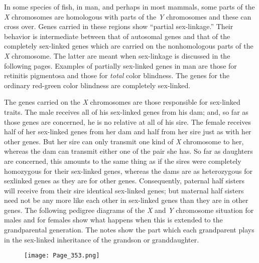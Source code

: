 In some species of fish, in man, and perhaps in most mammals, some
parts of the \textit{X} chromosomes are homologous with parts of the
\textit{Y} chromosomes and these can cross over. Genes carried in these
regions show ``partial sex-linkage.'' Their behavior is intermediate
between that of autosomal genes and that of the completely sex-linked
genes which are carried on the nonhomologous parts of the \textit{X}
chromosome. The latter are meant when sex-linkage is discussed in the
following pages. Examples of partially sex-linked genes in man are
those for retinitis pigmentosa and those for \textit{total} color
blindness. The genes for the ordinary red-green color blindness are
completely sex-linked.

The genes carried on the \textit{X} chromosomes are those responsible for
sex-linked traits. The male receives all of his sex-linked genes from his
dam; and, so far as those genes are concerned, he is no relative at all of
his sire. The female receives half of her sex-linked genes from her dam
and half from her sire just as with her other genes. But her sire can only
transmit one kind of \textit{X} chromosome to her, whereas the dam can transmit
either one of the pair she has. So far as daughters are concerned, this
amounts to the same thing as if the sires were completely homozygous
for their sex-linked genes, whereas the dams are as heterozygous for sexlinked
genes as they are for other genes. Consequently, paternal half
sisters will receive from their sire identical sex-linked genes; but
maternal half sisters need not be any more like each other in sex-linked
genes than they are in other genes. The following pedigree diagrams of
the \textit{X} and \textit{Y} chromosome situation for males and for females show what
happens when this is extended to the grandparental generation. The
notes show the part which each grandparent plays in the sex-linked
inheritance of the grandson or granddaughter.

\begin{figure}
	\centering
    \texttt{[image: Page\_353.png]}
\end{figure}

